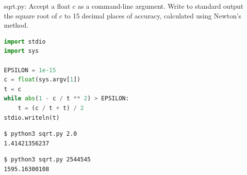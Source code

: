 \documentclass[8pt,a4paper,compress]{beamer}
\begin{document}
\begin{frame}[fragile]
\pause

\begin{framed}
\tiny sqrt.py: Accept a float $c$ as a command-line argument. Write to standard output the square root of $c$ to 15 decimal places of accuracy, calculated using Newton's method.
\end{framed}

\begin{minipage}{150pt}
\begin{lstlisting}[language=Python,style=focusin]
import stdio
import sys

EPSILON = 1e-15
c = float(sys.argv[1])
t = c
while abs(1 - c / t ** 2) > EPSILON:
    t = (c / t + t) / 2
stdio.writeln(t)
\end{lstlisting}
\end{minipage}%
\begin{minipage}{150pt}
\hfill {}
\end{minipage}

\pause\bigskip

\begin{lstlisting}[language={},style=focusin]
$ python3 sqrt.py 2.0
1.41421356237
\end{lstlisting}

\pause\bigskip

\begin{lstlisting}[language={},style=focusin]
$ python3 sqrt.py 2544545
1595.16300108
\end{lstlisting}
\end{frame}
\end{document}
